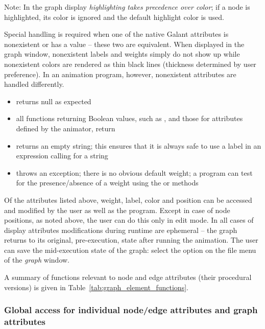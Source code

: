 Note: In the graph display \emph{highlighting takes precedence over color};
if a node is highlighted, its color is ignored and the default highlight
color is used.

Special handling is required when one of the native Galant attributes
is nonexistent or has a
 value -- these two are equivalent.
When displayed in the graph window, nonexistent labels and weights simply do
not show up while nonexistent colors are rendered as thin black lines
(thickness determined by user preference).
In an animation program, however, nonexistent attributes are handled
differently.
\begin{itemize}
\item {} returns null as expected
\item all functions returning Boolean values, such as ,
   and those for attributes defined by the animator, return
\item {} returns an empty string; this ensures that it is always
  safe to use a label in an expression calling for a string
\item {} throws an exception; there is no obvious default
  weight; a program can test for the presence/absence of a weight using the
   or  methods
\end{itemize}

Of the attributes listed above, weight, label, color and position can be
accessed and modified by the user as well as the program.
Except in case of node positions, as noted above,
the user can do this only in edit mode.
In all cases of display attributes
modifications during runtime are ephemeral
-- the graph returns to its original, pre-execution, state after running the
animation.
The user can save the mid-execution state of the graph:
select the  option on the file menu of the
\emph{graph} window.



A summary of functions relevant to node and edge attributes (their procedural versions)
is given in Table~\ref{tab:graph_element_functions}.

\subsubsection{Global access for individual node/edge attributes and graph attributes}

